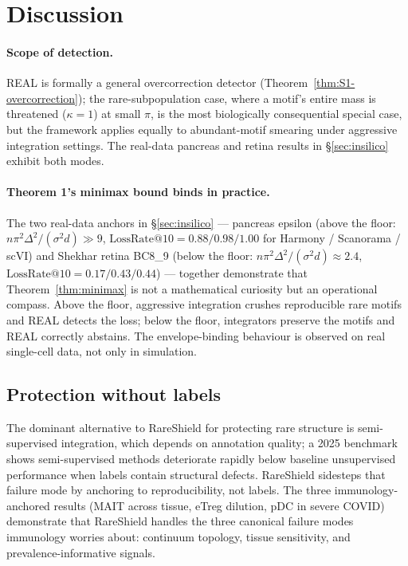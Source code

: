 \section{Discussion}



\paragraph{Scope of detection.} REAL is formally a general overcorrection detector (Theorem~\ref{thm:S1-overcorrection}); the rare-subpopulation case, where a motif's entire mass is threatened ($\kappa = 1$) at small $\pi$, is the most biologically consequential special case, but the framework applies equally to abundant-motif smearing under aggressive integration settings.  The real-data pancreas and retina results in \S\ref{sec:insilico} exhibit both modes.

\paragraph{Theorem 1's minimax bound binds in practice.}  The two real-data anchors in \S\ref{sec:insilico} --- pancreas epsilon (above the floor: $n\pi^2\Delta^2/(\sigma^2 d)\gg 9$, $\mathrm{LossRate}@10 = 0.88/0.98/1.00$ for Harmony / Scanorama / scVI) and Shekhar retina BC8\_9 (below the floor: $n\pi^2\Delta^2/(\sigma^2 d) \approx 2.4$, $\mathrm{LossRate}@10 = 0.17/0.43/0.44$) --- together demonstrate that Theorem~\ref{thm:minimax} is not a mathematical curiosity but an operational compass.  Above the floor, aggressive integration crushes reproducible rare motifs and REAL detects the loss; below the floor, integrators preserve the motifs and REAL correctly abstains.  The envelope-binding behaviour is observed on real single-cell data, not only in simulation.

\subsection{Protection without labels}

The dominant alternative to RareShield for protecting rare structure is semi-supervised integration, which depends on annotation quality; a 2025 benchmark \citep{SemiSupBenchmark2025} shows semi-supervised methods deteriorate rapidly below baseline unsupervised performance when labels contain structural defects.  RareShield sidesteps that failure mode by anchoring to reproducibility, not labels.  The three immunology-anchored results (MAIT across tissue, eTreg dilution, pDC in severe COVID) demonstrate that RareShield handles the three canonical failure modes immunology worries about: continuum topology, tissue sensitivity, and prevalence-informative signals.

